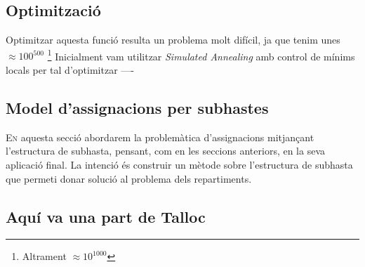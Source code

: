 \documentclass[10pt,twocolumn]{article}
\begin{document}
\subsection{Optimització}
Optimitzar aquesta funció resulta un problema molt difícil, ja que tenim unes $\approx 100^{500}$ \footnote{Altrament $ \approx 10^{1000}$}
Inicialment vam utilitzar \textit{Simulated Annealing} amb control de mínims locals per tal d'optimitzar 
----
\\
\newpage
\begin{tcolorbox}[colframe=white,colback=redviolet!20,sharp corners=all,size=minimal,halign=center,valign=center]
	\section{Model d'assignacions  per subhastes  }
\end{tcolorbox}
\lettrine{E}n aquesta secció abordarem la problemàtica d'assignacions mitjançant l'estructura de subhasta, pensant, com en les seccions anteriors, en la seva aplicació final. La intenció  és construir un mètode sobre l'estructura de subhasta que permeti  donar solució al problema dels repartiments.
\subsection{Aquí va una part de Talloc}
\end{document}
